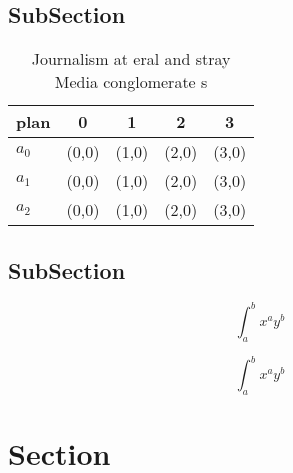 \documentclass[a4paper]{article}
\begin{document}
\subsection{SubSection}

\begin{table}
\begin{adjustbox}{width=0.5\columnwidth}
\begin{tabular}{|l|l|l|l|l|}
\hline
\textbf{plan} & \multicolumn{1}{c|}{\textbf{0}} & \multicolumn{1}{c|}{\textbf{1}} & \multicolumn{1}{c|}{\textbf{2}} & \multicolumn{1}{c|}{\textbf{3}} \\ \hline
\textbf{$a_0$}  & (0,0) & (1,0) & (2,0) & (3,0) \\ \hline
\textbf{$a_1$}  & (0,0) & (1,0) & (2,0) & (3,0) \\ \hline
\textbf{$a_2$}  & (0,0) & (1,0) & (2,0) & (3,0) \\ \hline
\end{tabular}
\end{adjustbox}
\caption{Journalism at eral and stray Media conglomerate s
}
\end{table}

\subsection{SubSection}

\[ \int_{a}^{b}{x^{a}y^{b}} \]

\[ \int_{a}^{b}{x^{a}y^{b}} \]

\section{Section}
\end{document}
